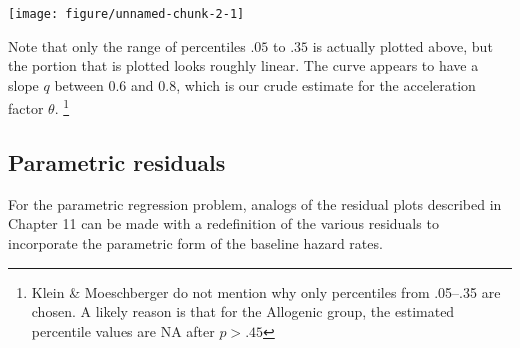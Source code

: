 \documentclass[10pt]{article}\usepackage[]{graphicx}\usepackage[]{xcolor}
\makeatletter
\def\maxwidth{ %
  \ifdim\Gin@nat@width>\linewidth
    \linewidth
  \else
    \Gin@nat@width
  \fi
}
\newenvironment{knitrout}{}{} %
\theoremstyle{definition}
\numberwithin{equation}{subsection}
\numberwithin{figure}{section}
\numberwithin{table}{subsection}
\numberwithin{Report}{section}
\numberwithin{Example}{subsection}
\makeatother
\begin{document}
\begin{knitrout}
\color{fgcolor}

{\centering \texttt{[image: figure/unnamed-chunk-2-1]} 

}


\end{knitrout}


\noindent Note that only the range of percentiles $.05$ to $.35$ is actually plotted above, but the portion that is plotted looks roughly linear.
The curve appears to have a slope $q$ between $0.6$ and $0.8$, which is our crude estimate for the acceleration factor $\theta$.
\footnote{Klein \& Moeschberger do not mention why only percentiles from .05--.35 are chosen. A likely reason is that for the Allogenic group, the estimated percentile values are NA after $p > .45$}

\newpage

\subsection{Parametric residuals}

For the parametric regression problem, analogs of the residual plots described in Chapter 11 can be made with a redefinition of the various residuals to incorporate the parametric form of the baseline hazard rates.
\end{document}
